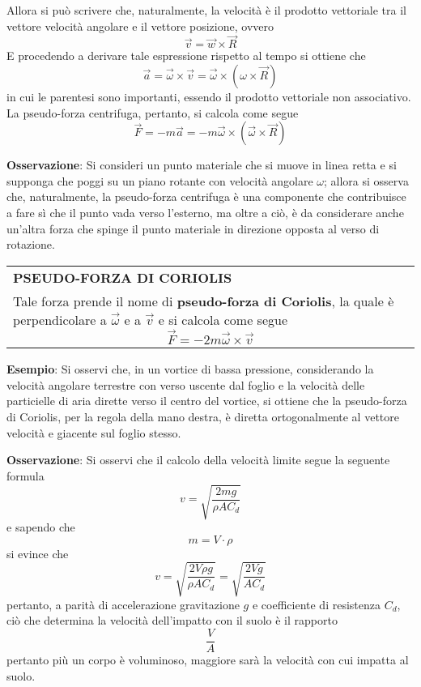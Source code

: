 \documentclass[a4paper]{extarticle}
\renewcommand\arraystretch{}
\begin{document}
\vspace{1em}
\noindent
Allora si può scrivere che, naturalmente, la velocità è il prodotto vettoriale tra il vettore velocità angolare e il vettore posizione, ovvero
\[\boxed{\vec v = \vec w \times \vec R}\]
E procedendo a derivare tale espressione rispetto al tempo si ottiene che
\[\boxed{\vec{a} = \vec{\omega} \times \vec{v} = \vec \omega \times \left(\omega \times \vec R \right)}\]
in cui le parentesi sono importanti, essendo il prodotto vettoriale non associativo.\\
La pseudo-forza centrifuga, pertanto,  si calcola come segue
\[\boxed{\vec F = -m \vec a = -m \vec \omega \times \left(\vec \omega \times \vec R \right)}\]

\vspace{1em}
\noindent
\textbf{Osservazione}: Si consideri un punto materiale che si muove in linea retta e si supponga che poggi su un piano rotante con velocità angolare $\omega$; allora si osserva che, naturalmente, la pseudo-forza centrifuga è una componente che contribuisce a fare sì che il punto vada verso l'esterno, ma oltre a ciò, è da considerare anche un'altra forza che spinge il punto materiale in direzione opposta al verso di rotazione.

\vspace{1em}
\setlength{\tabcolsep}{14pt}
\renewcommand{\arraystretch}{2}
\noindent
\begin{tabularx}{\textwidth}{@{}|P|@{}}
    \hline
    {\textbf{PSEUDO-FORZA DI CORIOLIS}}\\
    \parbox{\linewidth}{Tale forza prende il nome di \textbf{pseudo-forza di Coriolis}, la quale è perpendicolare a $\vec \omega$ e a $\vec v$ e si calcola come segue
    \[\boxed{\vec F = -2 m \vec \omega \times \vec v}\]
    \vspace{-1mm}}\\
    \hline
\end{tabularx}

\vspace{1em}
\noindent
\textbf{Esempio}: Si osservi che, in un vortice di bassa pressione, considerando la velocità angolare terrestre con verso uscente dal foglio e la velocità delle particielle di aria dirette verso il centro del vortice, si ottiene che la pseudo-forza di Coriolis, per la regola della mano destra, è diretta ortogonalmente al vettore velocità e giacente sul foglio stesso.

\vspace{1em}
\noindent
\textbf{Osservazione}: Si osservi che il calcolo della velocità limite segue la seguente formula
\[v = \sqrt{\frac{2mg}{\rho A C_d}}\]
e sapendo che
\[m = V \cdot \rho\]
si evince che
\[v = \sqrt{\frac{2 V \rho g}{\rho A C_d}} = \sqrt{\frac{2 V g}{A C_d}}\]
pertanto, a parità di accelerazione gravitazione $g$ e coefficiente di resistenza $C_d$, ciò che determina la velocità dell'impatto con il suolo è il rapporto
\[\frac{V}{A}\]
pertanto più un corpo è voluminoso, maggiore sarà la velocità con cui impatta al suolo.
\end{document}
